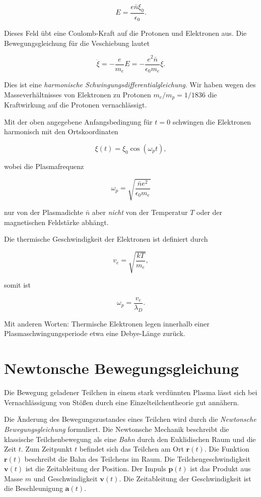 \documentclass[
  a4paper,
  DIV=11]{scrreprt}
\begin{document}
\[
E = \frac{e \bar n \xi_0}{\epsilon_0}.
\]

Dieses Feld übt eine Coulomb-Kraft auf die Protonen und Elektronen aus.
Die Bewegungsgleichung für die Veschiebung lautet

\[
\ddot \xi = - \frac{e}{m_e} E = - \frac{e^2 \bar n}{\epsilon_0 m_e} \xi.
\]

Dies ist eine \emph{harmonische Schwingungsdifferentialgleichung}. Wir
haben wegen des Masseverhältnisses von Elektronen zu Protonen
\(m_e/m_p = 1 / 1836\) die Kraftwirkung auf die Protonen vernachlässigt.

Mit der oben angegebene Anfangsbedingung für \(t=0\) schwingen die
Elektronen harmonisch mit den Ortskoordinaten

\[
\xi(t) = \xi_0 \cos(\omega_p t),
\]

wobei die Plasmafrequenz

\[
\omega_p = \sqrt{ \frac{\bar n e^2}{\epsilon_0 m_e} }
\]

nur von der Plasmadichte \(\bar n\) aber \emph{nicht} von der Temperatur
\(T\) oder der magnetischen Feldstärke abhängt.

Die thermische Geschwindigkeit der Elektronen ist definiert durch

\[
v_e = \sqrt{ \frac{k T}{m_e} },
\]

somit ist

\[
\omega_p = \frac{v_e}{\lambda_D}.
\]

Mit anderen Worten: Thermische Elektronen legen innerhalb einer
Plasmaschwingungsperiode etwa eine Debye-Länge zurück.

\hypertarget{newtonsche-bewegungsgleichung}{%
\chapter{Newtonsche
Bewegungsgleichung}\label{newtonsche-bewegungsgleichung}}

Die Bewegung geladener Teilchen in einem stark verdünnten Plasma lässt
sich bei Vernachlässigung von Stößen durch eine Einzelteilchentheorie
gut annähern.

Die Änderung des Bewegungszustandes eines Teilchen wird durch die
\emph{Newtonsche Bewegungsgleichung} formuliert. Die Newtonsche Mechanik
beschreibt die klassische Teilchenbewegung als eine \emph{Bahn} durch
den Euklidischen Raum und die Zeit \(t\). Zum Zeitpunkt \(t\) befindet
sich das Teilchen am Ort \(\mathbf r(t)\). Die Funktion \(\mathbf r(t)\)
beschreibt die Bahn des Teilchens im Raum. Die Teilchengeschwindigkeit
\(\mathbf v(t)\) ist die Zeitableitung der Position. Der Impuls
\(\mathbf p(t)\) ist das Produkt aus Masse \(m\) und Geschwindigkeit
\(\mathbf v(t)\). Die Zeitableitung der Geschwindigkeit ist die
Beschleunigung \(\mathbf a(t)\).
\end{document}
